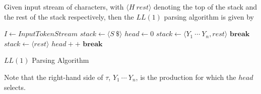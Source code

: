 \begin{definition}
    Given input stream of characters, with $\langle H\ rest \rangle$ denoting the top of the stack and the rest of the stack respectively, then the $LL(1)$ parsing algorithm is given by
    \begin{algorithm}[H]
        \begin{algorithmic}[1]
                \State $I \gets InputTokenStream$
                \State $stack \gets \langle S\ \$ \rangle$
                \State $head \gets 0$
                \Repeat
                                \State $stack \gets \langle Y_1\ \cdots\ Y_n, rest \rangle$
                            \Else
                                \State {}
                            \EndIf
                            \State $\textbf{break}$
                        \EndCase
                                \State $stack \gets \langle rest \rangle$
                                \State $head{+}{+}$
                            \Else
                                \State {}
                            \EndIf
                            \State $\textbf{break}$
                        \EndCase
                    \EndSwitch
            \EndProcedure
        \end{algorithmic}
        \caption{$LL(1)$ Parsing Algorithm}
        \label{prog:ll1-parsing-algorithm}
    \end{algorithm}
    
    Note that the right-hand side of $\tau$, $Y_1\ \cdots\ Y_n$, is the production for which the $head$ selects.
\end{definition}
